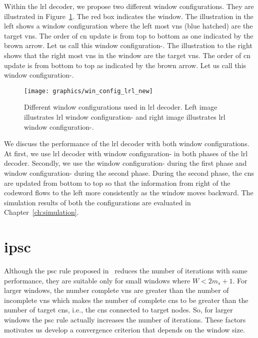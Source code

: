 Within the \gls{lrl} decoder, we propose two different window configurations. They are illustrated in Figure~\ref{fig:win_config_lrl}. The red box indicates the window. The illustration in the left shows a window configuration where the left most \glspl{vn} (blue hatched) are the target \glspl{vn}. The order of \gls{cn} update is from top to bottom as one indicated by the brown arrow. Let us call this window configuration-. The illustration to the right shows that the right most \glspl{vn} in the window are the target \glspl{vn}. The order of \gls{cn} update is from bottom to top as indicated by the brown arrow. Let us call this window configuration-.

\begin{figure}[htbp]
  \centering
  \texttt{[image: graphics/win\_config\_lrl\_new]}
  \caption[Different window configurations used in \acrshort{lrl} decoder.]{Different window configurations used in \gls{lrl} decoder. Left image illustrates \gls{lrl} window configuration- and right image illustrates \gls{lrl} window configuration-.}
  \label{fig:win_config_lrl}
\end{figure}

We discuss the performance of the \gls{lrl} decoder with both window configurations. At first, we use \gls{lrl} decoder with window configuration- in both phases of the \gls{lrl} decoder. Secondly, we use the window configuration- during the first phase and window configuration- during the second phase. During the second phase, the \glspl{cn} are updated from bottom to top so that the information from right of the codeword flows to the left more consistently as the window moves backward. The simulation results of both the configurations are evaluated in Chapter~\ref{ch:simulation}.

\section{\texorpdfstring{\acrlong{ipsc}}{IPSC}}
Although the \gls{psc} rule proposed in~\cite{Kang2018} reduces the number of iterations with same performance, they are suitable only for small windows where $W<2m_s+1$. For larger windows, the number complete \glspl{vn} are greater than the number of incomplete \glspl{vn} which makes the number of complete \glspl{cn} to be greater than the number of target \glspl{cn}, i.e., the \glspl{cn} connected to target nodes. So, for larger windows the \gls{psc} rule actually increases the number of iterations. These factors motivates us develop a convergence criterion that depends on the window size.

